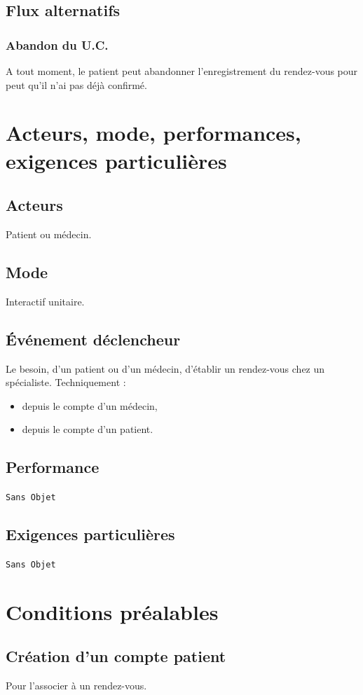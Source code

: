 \documentclass[a4paper, 11pt]{report}
\begin{document}
\subsection{Flux alternatifs}

\subsubsection{Abandon du U.C.}
A tout moment, le patient peut abandonner l'enregistrement du rendez-vous pour
peut qu'il n'ai pas déjà confirmé.
\newpage

\section{Acteurs, mode, performances, exigences particulières}
\subsection{Acteurs}
Patient ou médecin.
\subsection{Mode}
Interactif unitaire.
\subsection{Événement déclencheur}
Le besoin, d'un patient ou d'un médecin, d'établir un rendez-vous chez un
spécialiste.
Techniquement :
\begin{itemize}
	\item depuis le compte d'un médecin,
	\item depuis le compte d'un patient.
\end{itemize}

\subsection{Performance}
\texttt{Sans Objet}
\subsection{Exigences particulières}
\texttt{Sans Objet}
\newpage

\section{Conditions préalables}
\subsection{Création d'un compte patient}
Pour l'associer à un rendez-vous.
\end{document}
